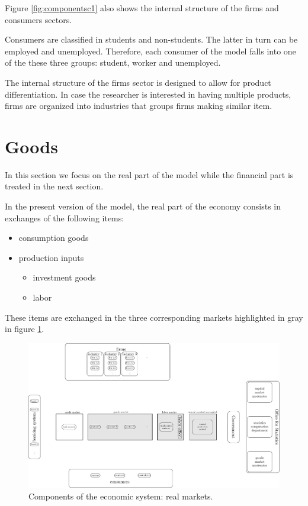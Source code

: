 \documentclass{book}
\begin{document}
Figure \ref{fig:componentsc1} also shows the internal structure of the firms and consumers sectors. 

Consumers are classified in students and non-students. The latter in turn can be employed and unemployed. Therefore, each consumer of the model falls into one of the these three groups: student, worker and unemployed.

The internal structure of the firms sector is designed to allow for product differentiation. In case the researcher is interested in having multiple products, firms are organized into industries that groups firms making similar item.


\clearpage
\section{Goods}
In this section we focus on the real part of the model while the financial part is treated in the next section.

In the present version of the model, the real part of the economy consists in exchanges of the following items:
\begin{itemize}
	\item consumption goods
	\item production inputs
		\begin{itemize}
			\item investment goods
			\item labor
		\end{itemize}
\end{itemize}

These items are exchanged in the three corresponding markets highlighted in gray in figure \ref{fig:componentsc2}.


\begin{figure}[htp]
\hskip-1cm\includegraphics[scale=0.5]{agents_and_interactions_figure1c2-0.pdf}
	\caption{Components of the economic system: real markets.}
	\label{fig:componentsc2}
\end{figure}
\end{document}
